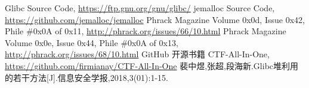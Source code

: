 \begin{thebibliography}{}  
 Glibc Source Code, \url{https://ftp.gnu.org/gnu/glibc/}
 jemalloc Source Code, \url{https://github.com/jemalloc/jemalloc}
 Phrack Magazine Volume 0x0d, Issue 0x42, Phile \#0x0A of 0x11, \url{http://phrack.org/issues/66/10.html}
 Phrack Magazine Volume 0x0e, Issue 0x44, Phile \#0x0A of 0x13, \url{http://phrack.org/issues/68/10.html}
 GitHub 开源书籍 CTF-All-In-One, \url{https://github.com/firmianay/CTF-All-In-One}
 裴中煜,张超,段海新.Glibc堆利用的若干方法[J].信息安全学报,2018,3(01):1-15.
\end{thebibliography}
